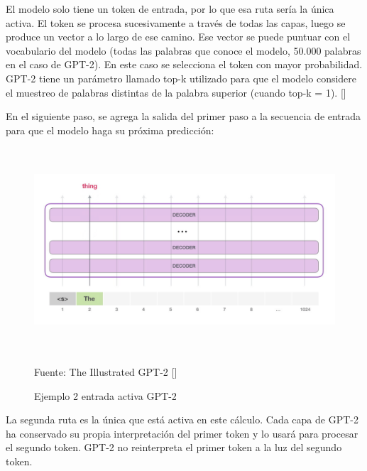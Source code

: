 \documentclass[../Main.tex]{subfiles}
\begin{document}
     
    
    \begin{justify}
     El modelo solo tiene un token de entrada, por lo que esa ruta sería la única activa. El token se procesa sucesivamente a través de todas las capas, luego se produce un vector a lo largo de ese camino. Ese vector se puede puntuar con el vocabulario del modelo (todas las palabras que conoce el modelo, 50.000 palabras en el caso de GPT-2). En este caso se selecciona el token con mayor probabilidad. GPT-2 tiene un parámetro llamado top-k utilizado para que el modelo considere el muestreo de palabras distintas de la palabra superior (cuando top-k = 1). []
     
     En el siguiente paso, se agrega la salida del primer paso a la secuencia de entrada para que el modelo haga su próxima predicción:
    \end{justify}
    
    \begin{figure}[H]
	\begin{Center}
		\includegraphics[width=6in,height=3in]{Chapters/04ChapterModelamiento/images/gpt-2-layers-input-2.png}
	    \caption{Ejemplo 2 entrada activa GPT-2}
	    Fuente: The Illustrated GPT-2 []
        \label{fig:section}
	\end{Center}
    \end{figure}
    
    \begin{justify}
    La segunda ruta es la única que está activa en este cálculo. Cada capa de GPT-2 ha conservado su propia interpretación del primer token y lo usará para procesar el segundo token. GPT-2 no reinterpreta el primer token a la luz del segundo token.
    \end{justify}
\end{document}
